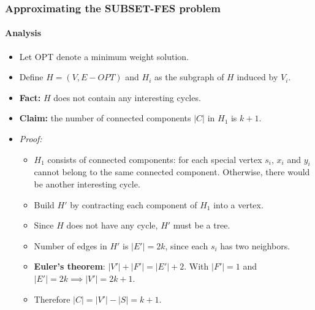 \documentclass[10pt]{beamer}
\begin{document}
\begin{frame}
    \frametitle{Approximating the SUBSET-FES problem}
    \framesubtitle{Analysis}
    \begin{itemize}
        \item Let OPT denote a minimum weight solution.
        \item Define \(H = (V, E - OPT)\) and \(H_i\) as the subgraph of \(H\) induced by \(V_i\).
        \item \textbf{Fact:} \(H\) does not contain any interesting cycles.
        \item \textbf{Claim:} the number of connected components \(|C|\) in \(H_1\) is \(k + 1\).
        \item \textit{Proof:}
            \begin{itemize}
                \item \(H_1\) consists of connected components: for each special vertex \(s_i\), \(x_i\) and \(y_i\) cannot belong to the same connected component. Otherwise, there would be another interesting cycle.
                \item Build \(H'\) by contracting each component of \(H_1\) into a vertex.
                \item Since \(H\) does not have any cycle, \(H'\) must be a tree.
                \item Number of edges in \(H'\) is \(|E'| = 2k\), since each \(s_i\) has two neighbors.
                \item \textbf{Euler's theorem}: \(|V'| + |F'| = |E'| + 2\). With \(|F'| = 1\) and \(|E'| = 2k \implies |V'| = 2k + 1\).
                \item Therefore \(|C| = |V'| - |S| = k + 1\).
            \end{itemize}
    \end{itemize}
\end{frame}
\end{document}

